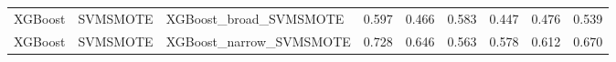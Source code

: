 \begin{tabular}{lllllllll}
                     XGBoost &            SVMSMOTE &                       XGBoost\_broad\_SVMSMOTE &     0.597 &                     0.466 &                 0.583 &                  0.447 &                                   0.476 &     0.539 \\
                     XGBoost &            SVMSMOTE &                      XGBoost\_narrow\_SVMSMOTE &     0.728 &                     0.646 &                 0.563 &                  0.578 &                                   0.612 &     0.670 \\
\bottomrule
\end{tabular}
